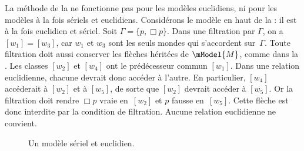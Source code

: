 \documentclass[../../../include/open-logic-section]{subfiles}
\begin{document}


La méthode de la  ne fonctionne pas pour les modèles
euclidiens, ni pour les modèles à la fois sériels et euclidiens.
Considérons le modèle en haut de la  : il est à la
fois euclidien et sériel. Soit $\Gamma = \{p, \Box p \}$. Dans une
filtration par $\Gamma$, on a $[w_1] = [w_3]$, car $w_1$ et $w_3$
sont les seuls mondes qui s'accordent sur~$\Gamma$. Toute filtration
doit aussi conserver les flèches héritées de $\mModel{M}$, comme dans la
. Les classes $[w_2]$ et $[w_4]$ ont le prédécesseur
commun $[w_1]$. Dans une relation euclidienne, chacune
devrait donc accéder à l'autre. En particulier, $[w_4]$
accéderait à $[w_2]$ et à $[w_5]$, de sorte que $[w_2]$
devrait accéder à $[w_5]$. Or la filtration doit rendre
$\Box p$ vraie en~$[w_2]$ et $p$ fausse en~$[w_5]$.
Cette flèche est donc interdite par la condition de filtration.
Aucune relation euclidienne ne convient.

\begin{figure}[htpb]
  \centering
  \caption{Un modèle sériel et euclidien.}
\end{figure}
\end{document}
